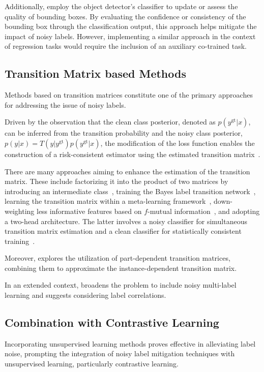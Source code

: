 \documentclass{article}
\theoremstyle{plain}
\theoremstyle{definition}
\theoremstyle{remark}
\begin{document}
Additionally, \citet{li2020towards, liu2022robust, schubert2023identifying, gao2018notercnn} employ the object detector's classifier to update or assess the quality of bounding boxes.
By evaluating the confidence or consistency of the bounding box through the classification output, this approach helps mitigate the impact of noisy labels.
However, implementing a similar approach in the context of regression tasks would require the inclusion of an auxiliary co-trained task.

\subsection{Transition Matrix based Methods}\label{subsec:transition_matrix_related_works}
Methods based on transition matrices constitute one of the primary approaches for addressing the issue of noisy labels.

Driven by the observation that the clean class posterior, denoted as $p(y^\text{gt}|x)$,
can be inferred from the transition probability and the noisy class posterior, $p(y|x)=T(y|y^\text{gt})p(y^\text{gt}|x)$,
the modification of the loss function enables the construction of a risk-consistent estimator using the estimated transition matrix~\citep{yao2020dual}.

There are many approaches aiming to enhance the estimation of the transition matrix.
These include factorizing it into the product of two matrices by introducing an intermediate class~\citep{yao2020dual}, training the Bayes label transition network~\citep{yang2021estimating},
learning the transition matrix within a meta-learning framework~\citep{wang2020training}, down-weighting less informative features based on $f$-mutual information~\citep{zhu2022beyond},
and adopting a two-head architecture. The latter involves a noisy classifier for simultaneous transition matrix estimation and a clean classifier for statistically consistent training~\citep{kye2021learning}.

Moreover, \citet{xia2020part} explores the utilization of part-dependent transition matrices, combining them to approximate the instance-dependent transition matrix.

In an extended context, \citet{li2022estimating} broadens the problem to include noisy multi-label learning and suggests considering label correlations.

\subsection{Combination with Contrastive Learning}\label{subsec:contrastive_learning_related_worls}
Incorporating unsupervised learning methods proves effective in alleviating label noise, prompting the integration of noisy label mitigation techniques with unsupervised learning, particularly contrastive learning.
\end{document}
